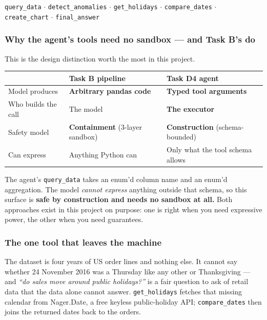 \documentclass[11pt,a4paper]{article}
\begin{document}
\begin{center}
\texttt{query\_data} $\cdot$ \texttt{detect\_anomalies} $\cdot$ \texttt{get\_holidays}
$\cdot$ \texttt{compare\_dates} $\cdot$ \texttt{create\_chart} $\cdot$ \texttt{final\_answer}
\end{center}

\subsubsection*{Why the agent's tools need no sandbox --- and Task B's do}

This is the design distinction worth the most in this project.

\begin{center}
\begin{tabularx}{\textwidth}{@{}lXX@{}}
\toprule
 & \textbf{Task B pipeline} & \textbf{Task D4 agent} \\
\midrule
Model produces          & \textbf{Arbitrary pandas code}      & \textbf{Typed tool arguments} \\
Who builds the call     & The model                           & \textbf{The executor} \\
Safety model            & \textbf{Containment} (3-layer sandbox) & \textbf{Construction} (schema-bounded) \\
Can express             & Anything Python can                 & Only what the tool schema allows \\
\bottomrule
\end{tabularx}
\end{center}

The agent's \texttt{query\_data} takes an enum'd column name and an enum'd aggregation.
The model \emph{cannot express} anything outside that schema, so this surface is
\textbf{safe by construction and needs no sandbox at all.} Both approaches exist in this
project on purpose: one is right when you need expressive power, the other when you need
guarantees.

\subsubsection*{The one tool that leaves the machine}

The dataset is four years of US order lines and nothing else. It cannot say whether
24 November 2016 was a Thursday like any other or Thanksgiving --- and \emph{``do sales
move around public holidays?''} is a fair question to ask of retail data that the data
alone cannot answer. \texttt{get\_holidays} fetches that missing calendar from
Nager.Date, a free keyless public-holiday API; \texttt{compare\_dates} then joins the
returned dates back to the orders.
\end{document}
